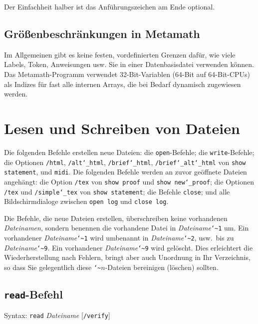 Der Einfachheit halber ist das Anführungszeichen am Ende optional. 


\subsection{Größenbeschränkungen in Metamath}

Im Allgemeinen gibt es keine festen, vordefinierten Grenzen dafür, wie viele Labels, Token, Anweisungen usw. Sie in einer Datenbasisdatei verwenden können.  Das Metamath-Programm verwendet 32-Bit-Variablen (64-Bit auf 64-Bit-CPUs) als Indizes für fast alle internen Arrays, die bei Bedarf dynamisch zugewiesen werden.  


\section{Lesen und Schreiben von Dateien}

Die folgenden Befehle erstellen neue Dateien: die \texttt{open}-Befehle; die \texttt{write}-Befehle; die Optionen \texttt{/html}, \texttt{/alt{\char`\_}html}, \texttt{/brief{\char`\_}html}, \texttt{/brief{\char`\_}alt{\char`\_}html} von \texttt{show statement}, und \texttt{midi}.  Die folgenden Befehle werden an zuvor geöffnete Dateien angehängt: die Option \texttt{/tex} von \texttt{show proof} und \texttt{show new{\char`\_}proof}; die Optionen \texttt{/tex} und \texttt{/simple{\char`\_}tex} von \texttt{show statement}; die Befehle \texttt{close}; und alle Bildschirmdialoge zwischen \texttt{open log} und \texttt{close log}. 

Die Befehle, die neue Dateien erstellen, überschreiben keine vorhandenen {\em Dateinamen}, sondern benennen die vorhandene Datei in {\em Dateiname}\texttt{{\char`\~}1} um.  Ein vorhandener {\em Dateiname}\texttt{{\char`\~}1} wird umbenannt in {\em Dateiname}\texttt{{\char`\~}2}, usw.\ bis zu {\em Dateiname}\texttt{{\char`\~}9}.  Ein vorhandener {\em Dateiname}\texttt{{\char`\~}9} wird gelöscht.  Dies erleichtert die Wiederherstellung nach Fehlern, bringt aber auch Unordnung in Ihr Verzeichnis, so dass Sie gelegentlich diese \texttt{{\char`\~}}$n$-Dateien bereinigen (löschen) sollten. 


\subsection{\texttt{read}-Befehl}

Syntax:  \texttt{read} {\em Dateiname} [\texttt{/verify}]

